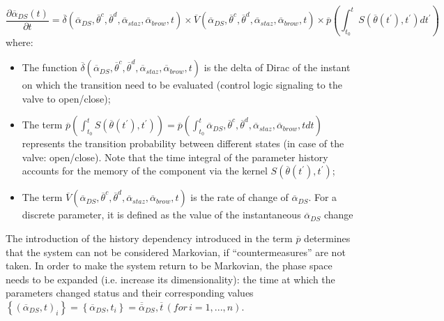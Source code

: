\begin{equation}
\label{eq:systemDiscAndStochVaryVars}
\frac{\partial  \overline{\alpha }_{DS}\left ( t \right )}{\partial t}=  \overline{\delta}\left ( \overline{\alpha }_{DS}, \overline{\theta}^{c},\overline{\theta}^{d},\overline{\alpha}_{staz},\overline{\alpha}_{brow},t \right ) \times \overline{V}\left ( \overline{\alpha }_{DS}, \overline{\theta}^{c},\overline{\theta}^{d},\overline{\alpha}_{staz},\overline{\alpha}_{brow},t \right ) \times \overline{p}\left ( \int_{t_{0}}^{t}  S\left ( \overline{\theta}\left ( t^{'} \right ),t^{'} \right )dt^{'} \right )
\end{equation}
where:
\begin{itemize}
  \item The function $\overline{\delta}\left ( \overline{\alpha }_{DS}, \overline{\theta}^{c},\overline{\theta}^{d},
  \overline{\alpha}_{staz},\overline{\alpha}_{brow},t \right )$ is the delta of Dirac of the instant on which the 
  transition need to be evaluated (control logic signaling to the valve to open/close);
  \item The term $\overline{p}\left ( \int_{t_{0}}^{t}  S\left ( \overline{\theta}\left ( t^{'} \right ),t^{'} \right )\right ) 
  = \overline{p}\left ( \int_{t_{0}}^{t}  \overline{\alpha }_{DS}, \overline{\theta}^{c},\overline{\theta}^{d},
  \overline{\alpha}_{staz},\overline{\alpha}_{brow},t dt\right )$ represents the transition probability
  between different states (in case of the valve: open/close). Note that the time integral of the
  parameter history accounts for the memory of the component via the kernel $S\left ( \overline{\theta}\left ( t^{'} 
  \right ),t^{'} \right )$;
  \item The term $\overline{V}\left ( \overline{\alpha }_{DS}, \overline{\theta}^{c},\overline{\theta}^{d},
  \overline{\alpha}_{staz},\overline{\alpha}_{brow},t \right )$ is the rate of change of $\overline{\alpha }_{DS}$. 
  For a discrete parameter, it is defined as the value of the instantaneous $\overline{\alpha }_{DS}$ change
\end{itemize}
The introduction of the history dependency introduced in the term $\overline{p}$ determines that the system can
not be considered Markovian, if ``countermeasures'' are not taken. In order to make the system return to be Markovian, the phase space needs to be expanded (i.e. increase its dimensionality): the time at which the 
parameters changed status and their corresponding values $\left \{  \left (\overline{\alpha}_{DS}, t \right )_{i} \right \} = \left \{  \overline{\alpha}_{DS}, t_{i} \right \} = \overline{\overline{\alpha}}_{DS}, \overline{t}\, \left ( for\, i=1,...,n \right )$.

